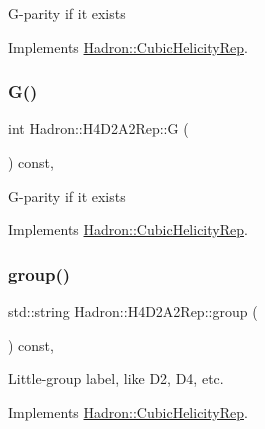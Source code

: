 G-\/parity if it exists 

Implements \mbox{\hyperlink{structHadron_1_1CubicHelicityRep_a50689f42be1e6170aa8cf6ad0597018b}{Hadron\+::\+Cubic\+Helicity\+Rep}}.

\mbox{\label{structHadron_1_1H4D2A2Rep_a07c16e2dbfa9c820954f66f17b0a270d}} 
\subsubsection{\texorpdfstring{G()}{G()}\hspace{0.1cm}{\footnotesize\ttfamily [2/2]}}
{\footnotesize\ttfamily int Hadron\+::\+H4\+D2\+A2\+Rep\+::G (\begin{DoxyParamCaption}{ }\end{DoxyParamCaption}) const\hspace{0.3cm}{\ttfamily [inline]}, {\ttfamily [virtual]}}

G-\/parity if it exists 

Implements \mbox{\hyperlink{structHadron_1_1CubicHelicityRep_a50689f42be1e6170aa8cf6ad0597018b}{Hadron\+::\+Cubic\+Helicity\+Rep}}.

\mbox{\label{structHadron_1_1H4D2A2Rep_aa2ecad1777dd00c1a36199688495a9ac}} 
\subsubsection{\texorpdfstring{group()}{group()}\hspace{0.1cm}{\footnotesize\ttfamily [1/3]}}
{\footnotesize\ttfamily std\+::string Hadron\+::\+H4\+D2\+A2\+Rep\+::group (\begin{DoxyParamCaption}{ }\end{DoxyParamCaption}) const\hspace{0.3cm}{\ttfamily [inline]}, {\ttfamily [virtual]}}

Little-\/group label, like D2, D4, etc. 

Implements \mbox{\hyperlink{structHadron_1_1CubicHelicityRep_a101a7d76cd8ccdad0f272db44b766113}{Hadron\+::\+Cubic\+Helicity\+Rep}}.

\mbox{\label{structHadron_1_1H4D2A2Rep_aa2ecad1777dd00c1a36199688495a9ac}} 

